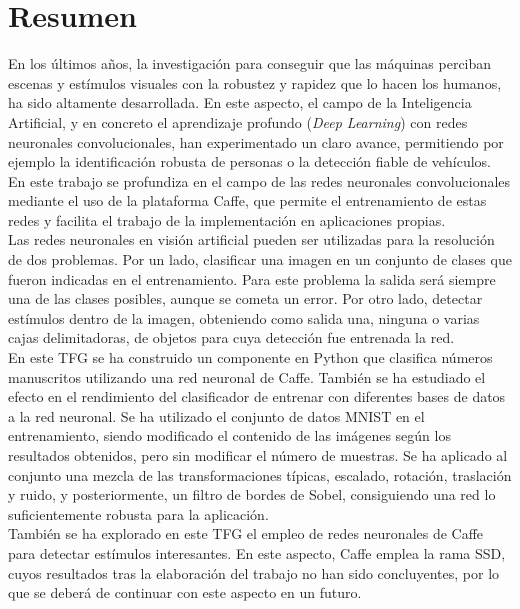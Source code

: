 \chapter*{Resumen}

En los últimos años, la investigación para conseguir que las máquinas perciban escenas y estímulos visuales con la robustez y rapidez que lo hacen los humanos, ha sido altamente desarrollada. En este aspecto, el campo de la Inteligencia Artificial, y en concreto el aprendizaje profundo (\textit{Deep Learning}) con redes neuronales convolucionales, han experimentado un claro avance, permitiendo por ejemplo la identificación robusta de personas o la detección fiable de vehículos. En este trabajo se profundiza en el campo de las redes neuronales convolucionales mediante el uso de la plataforma Caffe, que permite el entrenamiento de estas redes y facilita el trabajo de la implementación en aplicaciones propias.\\

Las redes neuronales en visión artificial pueden ser utilizadas para la resolución de dos problemas. Por un lado, clasificar una imagen en un conjunto de clases que fueron indicadas en el entrenamiento.  Para este problema la salida será siempre una de las clases posibles, aunque se cometa un error. Por otro lado, detectar estímulos dentro de la imagen, obteniendo como salida una, ninguna o varias cajas delimitadoras, de objetos para cuya detección fue entrenada la red.\\

En este TFG se ha construido un componente en Python que clasifica números manuscritos utilizando una red
neuronal de Caffe. También se ha estudiado el efecto en el rendimiento del clasificador de entrenar con diferentes bases de datos a la red neuronal. Se ha utilizado el conjunto de datos MNIST en el entrenamiento, siendo modificado el contenido de las imágenes según los resultados obtenidos, pero sin modificar el número de muestras. Se ha aplicado al conjunto una mezcla de las transformaciones típicas, escalado, rotación, traslación y ruido, y posteriormente, un filtro de bordes de Sobel, consiguiendo una red lo suficientemente robusta para la aplicación.\\

También se ha explorado en este TFG el empleo de redes neuronales de Caffe para detectar estímulos interesantes. En este aspecto, Caffe emplea la rama SSD, cuyos resultados tras la elaboración del trabajo no han sido concluyentes, por lo que se deberá de continuar con este aspecto en un futuro.